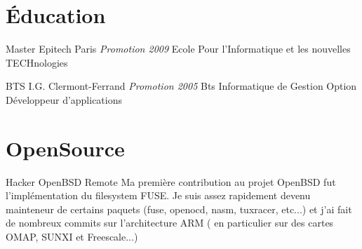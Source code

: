 \documentclass[11pt,a4paper,sans]{moderncv}
\begin{document}
\section{\'Education}

{Master}
{Epitech}
{Paris}
{\textit{Promotion 2009}}
{Ecole Pour l'Informatique et les nouvelles TECHnologies}

{BTS}
{I.G.}
{Clermont-Ferrand}
{\textit{Promotion 2005}}
{Bts Informatique de Gestion Option D\'{e}veloppeur d'applications}

\section{OpenSource}

{Hacker}
{OpenBSD}
{Remote}
{}
{
Ma premi\`ere contribution au projet OpenBSD fut l'impl\'ementation du filesystem
FUSE.\newline{}
Je suis assez rapidement devenu mainteneur de certains paquets (fuse, 
openocd, nasm, tuxracer, etc...) et j'ai fait de nombreux commits sur l'architecture
ARM ( en particulier sur des cartes OMAP, SUNXI et Freescale...) 
}
\end{document}
